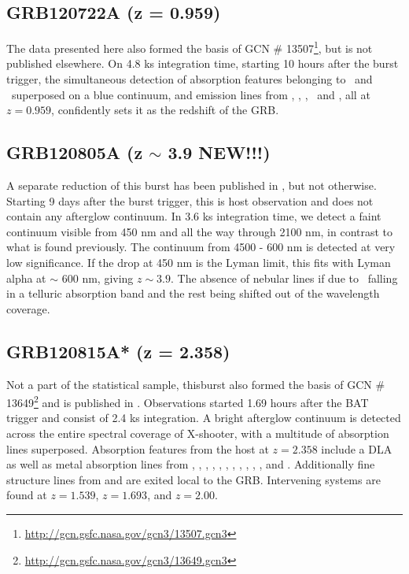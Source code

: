 \documentclass{aa}    %
\begin{document}
\subsection{GRB120722A (z = 0.959)}
The data presented here also formed the basis of GCN \#
13507\footnote{\url{http://gcn.gsfc.nasa.gov/gcn3/13507.gcn3}}, but is not
published elsewhere. On 4.8 ks integration time, starting 10 hours after the
burst trigger, the simultaneous detection of absorption features belonging to
\mgii~and \feii~superposed on a blue continuum, and emission lines from \oii,
\hg, \hb, \oiii~and \ha, all at $z = 0.959$, confidently sets it as the
redshift of the GRB.



\subsection{GRB120805A (z $\sim$ 3.9 NEW!!!)}
A separate reduction of this burst has been published in \citet{Kruhler2015},
but not otherwise. Starting 9 days after the burst trigger, this is host
observation and does not contain any afterglow continuum. In 3.6 ks integration
time, we detect a faint continuum visible from 450 nm and all the way through
2100 nm, in contrast to what is found previously. The continuum from 4500 -
600 nm is detected at very low significance. If the drop at 450 nm is the
Lyman limit, this fits with Lyman alpha at $\sim$ 600 nm, giving $z \sim
3.9$. The absence of nebular lines if due to \oii~falling in a telluric
absorption band and the rest being shifted out of the wavelength coverage.

\subsection{GRB120815A* (z = 2.358)} 
Not a part of the statistical sample, thisburst also formed the basis of  GCN
\# 13649\footnote{\url{http://gcn.gsfc.nasa.gov/gcn3/13649.gcn3}} and is
published in \citet{Kruhler2013}. Observations started 1.69 hours after the BAT
trigger and consist of 2.4 ks integration. A bright afterglow continuum is
detected across the entire spectral coverage of X-shooter, with a multitude of
absorption lines superposed. Absorption features from the host at $z = 2.358$
include a DLA as well as metal absorption lines from \nv, \sii, \SIii, \oi,
\civ, \SIiv, \feii, \alii, \aliii, \mnii, \mgii, and \mgi. Additionally
fine structure lines from \NIii and \feii are exited local to the GRB.
Intervening systems are found at $z = 1.539$, $z = 1.693$, and $z = 2.00$.
\end{document}
